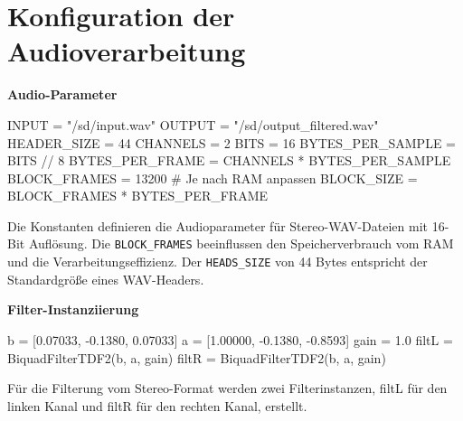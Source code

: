 \documentclass[
  ngerman,
  letterpaper,
  DIV=11]{scrreprt}
\newenvironment{Shaded}{\begin{snugshade}}{\end{snugshade}}
\newcommand{\CommentTok}[1]{\textcolor[rgb]{0.37,0.37,0.37}{#1}}
\newcommand{\DecValTok}[1]{\textcolor[rgb]{0.68,0.00,0.00}{#1}}
\newcommand{\FloatTok}[1]{\textcolor[rgb]{0.68,0.00,0.00}{#1}}
\newcommand{\NormalTok}[1]{\textcolor[rgb]{0.00,0.23,0.31}{#1}}
\newcommand{\OperatorTok}[1]{\textcolor[rgb]{0.37,0.37,0.37}{#1}}
\newcommand{\StringTok}[1]{\textcolor[rgb]{0.13,0.47,0.30}{#1}}
\begin{document}
\section{Konfiguration der
Audioverarbeitung}\label{konfiguration-der-audioverarbeitung}

\textbf{Audio-Parameter}

\begin{Shaded}
\begin{Highlighting}[]
\NormalTok{INPUT }\OperatorTok{=} \StringTok{"/sd/input.wav"}
\NormalTok{OUTPUT }\OperatorTok{=} \StringTok{"/sd/output\_filtered.wav"}
\NormalTok{HEADER\_SIZE }\OperatorTok{=} \DecValTok{44}
\NormalTok{CHANNELS }\OperatorTok{=} \DecValTok{2}
\NormalTok{BITS }\OperatorTok{=} \DecValTok{16}
\NormalTok{BYTES\_PER\_SAMPLE }\OperatorTok{=}\NormalTok{ BITS }\OperatorTok{//} \DecValTok{8}
\NormalTok{BYTES\_PER\_FRAME }\OperatorTok{=}\NormalTok{ CHANNELS }\OperatorTok{*}\NormalTok{ BYTES\_PER\_SAMPLE}
\NormalTok{BLOCK\_FRAMES }\OperatorTok{=} \DecValTok{13200}  \CommentTok{\# Je nach RAM anpassen}
\NormalTok{BLOCK\_SIZE }\OperatorTok{=}\NormalTok{ BLOCK\_FRAMES }\OperatorTok{*}\NormalTok{ BYTES\_PER\_FRAME}
\end{Highlighting}
\end{Shaded}

Die Konstanten definieren die Audioparameter für Stereo-WAV-Dateien mit
16-Bit Auflösung. Die \texttt{BLOCK\_FRAMES} beeinflussen den
Speicherverbrauch vom RAM und die Verarbeitungseffizienz. Der
\texttt{HEADS\_SIZE} von 44 Bytes entspricht der Standardgröße eines
WAV-Headers.

\textbf{Filter-Instanziierung}

\begin{Shaded}
\begin{Highlighting}[]
\NormalTok{b }\OperatorTok{=}\NormalTok{ [}\FloatTok{0.07033}\NormalTok{, }\OperatorTok{{-}}\FloatTok{0.1380}\NormalTok{, }\FloatTok{0.07033}\NormalTok{]}
\NormalTok{a }\OperatorTok{=}\NormalTok{ [}\FloatTok{1.00000}\NormalTok{, }\OperatorTok{{-}}\FloatTok{0.1380}\NormalTok{, }\OperatorTok{{-}}\FloatTok{0.8593}\NormalTok{]}
\NormalTok{gain }\OperatorTok{=} \FloatTok{1.0}
\NormalTok{filtL }\OperatorTok{=}\NormalTok{ BiquadFilterTDF2(b, a, gain)}
\NormalTok{filtR }\OperatorTok{=}\NormalTok{ BiquadFilterTDF2(b, a, gain)}
\end{Highlighting}
\end{Shaded}

Für die Filterung vom Stereo-Format werden zwei Filterinstanzen, filtL
für den linken Kanal und filtR für den rechten Kanal, erstellt.
\end{document}
